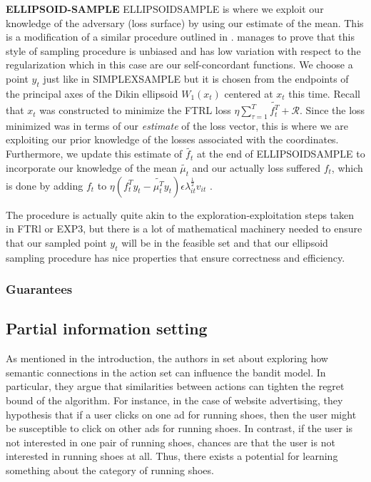 \textbf{ELLIPSOID-SAMPLE}
ELLIPSOIDSAMPLE is where we exploit our knowledge of the adversary (loss surface) by using our estimate of the mean. This is a modification of a similar procedure outlined in \citep{abernethy}. \citep{abernethy} manages to  prove that this style of sampling procedure is unbiased and has low variation with respect to the regularization which in this case are our self-concordant functions. We choose a point $y_t$ just like in SIMPLEXSAMPLE but it is  chosen from the endpoints of the principal axes of the Dikin ellipsoid $W_1(x_t)$ centered at $x_t$ this time. Recall that $x_t$ was constructed to minimize the FTRL loss $\eta \sum_{\tau=1}^T\tilde{f_t^T} +\mathcal{R}$. Since the loss minimized was in terms of our \textit{estimate} of the loss vector, this is where we are exploiting our prior knowledge of the losses associated with the coordinates. Furthermore, we update this estimate of $\tilde{f_t}$ at the end of ELLIPSOIDSAMPLE to incorporate our knowledge of the mean $\tilde{\mu_t}$ and our actually loss suffered $f_t$, which is done by adding $f_t$ to  $\eta (f_{t}^Ty_t - \tilde{\mu_{t}^T}y_t)\epsilon \lambda_{it}^{\frac{1}{2}}v_{it}$ .

The procedure is actually quite akin to the exploration-exploitation steps taken in FTRl or EXP3, but there is a lot of mathematical machinery needed to ensure that our sampled point $y_t$ will be in the feasible set and that our ellipsoid sampling procedure has nice properties that ensure correctness and efficiency. 

\subsubsection{Guarantees}



\subsection{Partial information setting}
As mentioned in the introduction, the authors in \citep{alon} set about exploring how semantic connections in the action set can influence the bandit model. In particular, they argue that similarities between actions can tighten the regret bound of the algorithm. For instance, in the case of website advertising, they hypothesis that if a user clicks on one ad for running shoes, then the user might be susceptible to click on other ads for running shoes. In contrast, if the user is not interested in one pair of running shoes, chances are that the user is not interested in running shoes at all. Thus, there exists a potential for learning something about the category of running shoes. 

